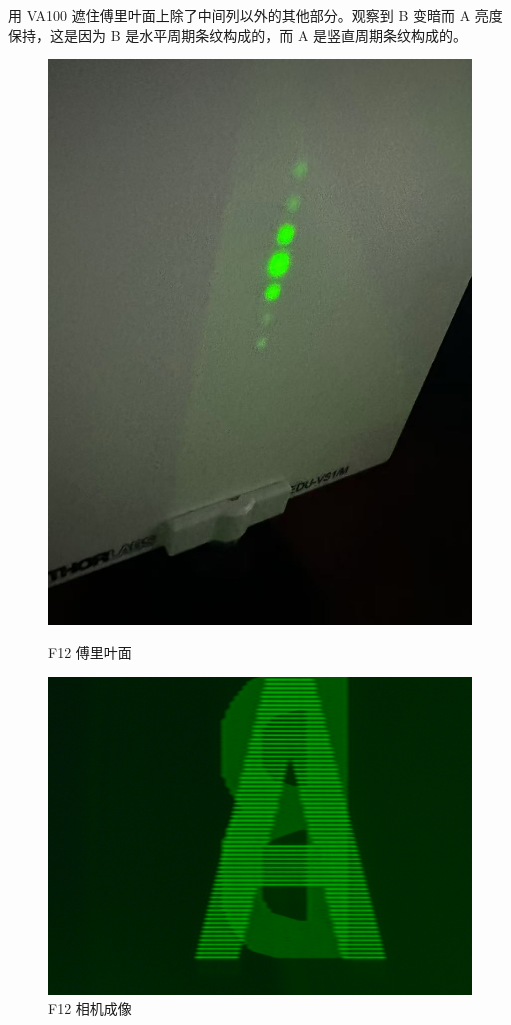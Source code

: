 \documentclass{ctexart}
\begin{document}
用 VA100 遮住傅里叶面上除了中间列以外的其他部分。观察到 B 变暗而 A 亮度保持，这是因为 B 是水平周期条纹构成的，而 A 是竖直周期条纹构成的。
\begin{figure}[H]
  \centering
  \begin{minipage}[b]{0.2\textwidth}
    \centering
    \includegraphics[width=\textwidth]{pictures/微信图片_20241017164835.jpg}
    \caption{F12 傅里叶面}
  \end{minipage}
  \hspace{0.1\textwidth} %
  \begin{minipage}[b]{0.3\textwidth}
    \centering
    \includegraphics[width=\textwidth]{pictures/F12-mask-Ex17.png}
    \caption{F12 相机成像}
  \end{minipage}
\end{figure}
\end{document}
